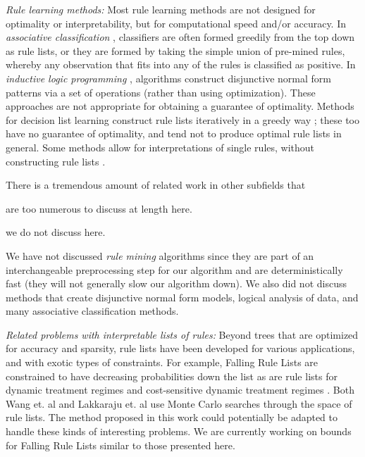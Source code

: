\textit{Rule learning methods:} 
Most rule learning methods are not designed for optimality or interpretability, but for computational speed and/or accuracy. In \textit{associative classification} \citep{Vanhoof10,Liu98,Li01,Yin03}, classifiers are often formed greedily from the top down as rule lists, or they are formed by taking the simple union of pre-mined rules, whereby any observation that fits into any of the rules is classified as positive.
%
In \textit{inductive logic programming} \citep{muggleton1994inductive},
algorithms construct disjunctive normal form patterns via a set of operations
(rather than using optimization).
%
These approaches are not appropriate for obtaining a guarantee of optimality.
%
Methods for decision list learning construct rule lists iteratively in a greedy way
\citep{Rivest87,Sokolova03,Marchand05,RudinLeMa13,Goessling2015};
these too have no guarantee of optimality, and tend not to produce optimal rule lists in general.
%
Some methods allow for interpretations of single rules, without constructing rule lists \citep{McCormick:2011ws}.

There is a tremendous amount of related work in other subfields that
\begin{arxiv}
are too numerous to discuss at length here.
\end{arxiv}
\begin{kdd}
we do not discuss here.
\end{kdd}
We have not discussed \textit{rule mining} algorithms since they are part of an interchangeable preprocessing step for our algorithm and are deterministically fast (\ie they will not generally slow our algorithm down). We also did not discuss methods that create disjunctive normal form models, \eg logical analysis of data, and many associative classification methods. 

\textit{Related problems with interpretable lists of rules:} Beyond trees that are optimized 
for accuracy and sparsity, rule lists have been developed for various applications,
and with exotic types of constraints.
%
For example, Falling Rule Lists \citep{WangRu15} are constrained to have decreasing probabilities down the list as are rule lists for dynamic treatment regimes \citep{ZhangEtAl15} and cost-sensitive dynamic treatment regimes \citep{LakkarajuRu17}. Both Wang et. al \cite{WangRu15} and Lakkaraju et. al \cite{LakkarajuRu17} use Monte Carlo searches through the space of rule lists. The method proposed in this work could potentially be adapted to handle these kinds of interesting problems. We are currently working on bounds for Falling Rule Lists \citep{ChenRu17} similar to those presented here.

